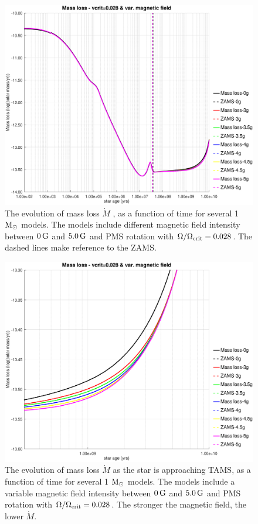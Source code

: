 \documentclass[fleqn,usenatbib]{mnras}
\begin{document}
{{\begin{figure}
	\includegraphics[trim = 30mm 15mm 20mm 15mm, clip,width=\columnwidth]{figures/mdot_vc_028_var_g.eps}
    \caption{The evolution of mass loss $\Dot{M}$ , as a function of time for several 1 $\mathrm{M}_\odot$ models. The models include different magnetic field intensity between $0\,\mathrm{G}$ and $5.0\,\mathrm{G}$ and PMS rotation with $\Omega / \Omega_{\mathrm{crit}}=0.028$. The dashed lines make reference to the ZAMS.}
    \label{fig:mdot_vc_028_var_b}
\end{figure}

\begin{figure}
	\includegraphics[trim = 30mm 15mm 20mm 15mm, clip,width=\columnwidth]{figures/mdot_vc_028_var_g_z1.eps}
    \caption{The evolution of mass loss $\Dot{M}$ as the star is approaching TAMS, as a function of time for several 1 $\mathrm{M}_\odot$ models. The models include a variable magnetic field intensity between $0\,\mathrm{G}$ and $5.0\,\mathrm{G}$ and PMS rotation with $\Omega / \Omega_{\mathrm{crit}}=0.028$. The stronger the magnetic field, the lower $\Dot{M}$.}
    \label{fig:mdot_vc_028_var_b_z1}
\end{figure}

}}
\end{document}
